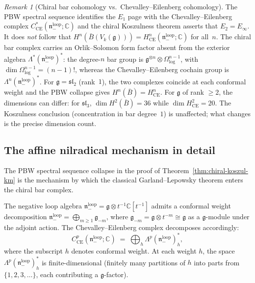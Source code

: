 \documentclass[11pt]{article}
\theoremstyle{plain}
\theoremstyle{definition}
\theoremstyle{remark}
\newtheorem{remark}[theorem]{Remark}
\newcommand{\fg}{\mathfrak{g}}
\newcommand{\fn}{\mathfrak{n}}
\newcommand{\fsl}{\mathfrak{sl}}
\newcommand{\barB}{\bar{B}}
\newcommand{\CE}{\mathrm{CE}}
\numberwithin{equation}{section}
\begin{document}
\begin{remark}[Chiral bar cohomology vs.\ Chevalley--Eilenberg
 cohomology]\label{warn:bar-vs-ce}
The PBW spectral sequence identifies the $E_1$ page with
the Chevalley--Eilenberg complex
$C^*_{\CE}(\fn_-^{\mathrm{loop}}; \mathbb{C})$ and the
chiral Koszulness theorem asserts that $E_2 = E_\infty$.
It does \emph{not} follow that
$H^n(\barB(V_k(\fg))) = H^n_{\CE}(\fn_-^{\mathrm{loop}};
\mathbb{C})$ for all~$n$. The chiral bar complex carries
an Orlik--Solomon form factor absent from the exterior
algebra $\Lambda^*(\fn_-^{\mathrm{loop}})^*$: the
degree-$n$ bar group is
$\fg^{\otimes n} \otimes \Omega^{n-1}_{\log}$, with
$\dim\Omega^{n-1}_{\log} = (n{-}1)!$, whereas the
Chevalley--Eilenberg cochain group is
$\Lambda^n(\fn_-^{\mathrm{loop}})^*$. For
$\fg = \fsl_2$ (rank~$1$), the two complexes coincide at
each conformal weight and the PBW collapse gives
$H^n(\barB) = H^n_{\CE}$. For $\fg$ of rank $\geq 2$,
the dimensions can differ: for $\fsl_3$,
$\dim H^2(\barB) = 36$ while
$\dim H^2_{\CE} = 20$. The Koszulness conclusion
(concentration in bar degree~$1$) is unaffected; what
changes is the precise dimension count.
\end{remark}

\subsection{The affine nilradical mechanism in detail}

The PBW spectral sequence collapse in the proof of
Theorem~\ref{thm:chiral-koszul-km} is the mechanism by which the
classical Garland--Lepowsky theorem enters the chiral bar complex.

The negative loop algebra
$\fn_-^{\mathrm{loop}} = \fg \otimes t^{-1}\mathbb{C}[t^{-1}]$
admits a conformal weight decomposition
$\fn_-^{\mathrm{loop}} = \bigoplus_{m \geq 1} \fg_{-m}$,
where $\fg_{-m} = \fg \otimes t^{-m} \cong \fg$ as a
$\fg$-module under the adjoint action. The
Chevalley--Eilenberg complex decomposes accordingly:
\begin{equation}\label{eq:ce-decomp}
C^p_{\CE}(\fn_-^{\mathrm{loop}}; \mathbb{C})
\;=\; \bigoplus_{h}
\Lambda^p(\fn_-^{\mathrm{loop}})^*_h,
\end{equation}
where the subscript $h$ denotes conformal weight.
At each weight $h$, the space
$\Lambda^p(\fn_-^{\mathrm{loop}})^*_h$ is
finite-dimensional (finitely many partitions of $h$ into
parts from $\{1, 2, 3, \ldots\}$, each contributing a
$\fg$-factor).
\end{document}
